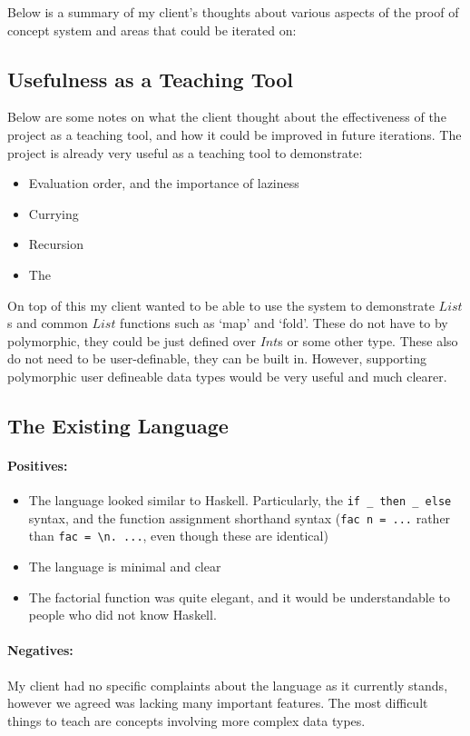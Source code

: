 Below is a summary of my client's thoughts about various aspects of the proof of concept system and areas that could be iterated on:

\subsection{Usefulness as a Teaching Tool}
Below are some notes on what the client thought about the effectiveness of the project as a teaching tool, and how it could be improved in future iterations.
The project is already very useful as a teaching tool to demonstrate:
\begin{itemize}
    \item Evaluation order, and the importance of laziness
    \item Currying
    \item Recursion
    \item The \lcalc
\end{itemize}

On top of this my client wanted to be able to use the system to demonstrate $List$s and common $List$ functions such as `map' and `fold'. These do not have to by polymorphic, they could be just defined over $Int$s or some other type. These also do not need to be user-definable, they can be built in. However, supporting polymorphic user defineable data types would be very useful and much clearer. 

\subsection{The Existing Language}
\paragraph{Positives:}
\begin{itemize}
    \item The language looked similar to Haskell. Particularly, the \verb|if _ then _ else| syntax, and the function assignment shorthand syntax (\verb|fac n = ...| rather than \verb|fac = \n. ...|, even though these are identical)
    \item The language is minimal and clear
    \item The factorial function was quite elegant, and it would be understandable to people who did not know Haskell.  
\end{itemize}

\paragraph{Negatives:}
My client had no specific complaints about the language as it currently stands, however we agreed was lacking many important features. The most difficult things to teach are concepts involving more complex data types. 

